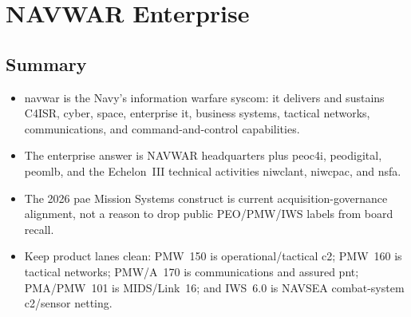 \documentclass[../main.tex]{subfiles}
\begin{document}

\section{NAVWAR Enterprise}


\subsection{Summary}
\begin{itemize}
  \item \ac{navwar} is the Navy's information warfare \ac{syscom}: it delivers and sustains C4ISR, cyber, space, enterprise \ac{it}, business systems, tactical networks, communications, and command-and-control capabilities.
  \item The enterprise answer is NAVWAR headquarters plus \ac{peoc4i}, \ac{peodigital}, \ac{peomlb}, and the Echelon~III technical activities \ac{niwclant}, \ac{niwcpac}, and \ac{nsfa}.
  \item The 2026 \ac{pae} Mission Systems construct is current acquisition-governance alignment, not a reason to drop public PEO/PMW/IWS labels from board recall.
  \item Keep product lanes clean: PMW~150 is operational/tactical \ac{c2}; PMW~160 is tactical networks; PMW/A~170 is communications and assured \ac{pnt}; PMA/PMW~101 is MIDS/Link~16; and IWS~6.0 is NAVSEA combat-system \ac{c2}/sensor netting.
\end{itemize}
\end{document}
